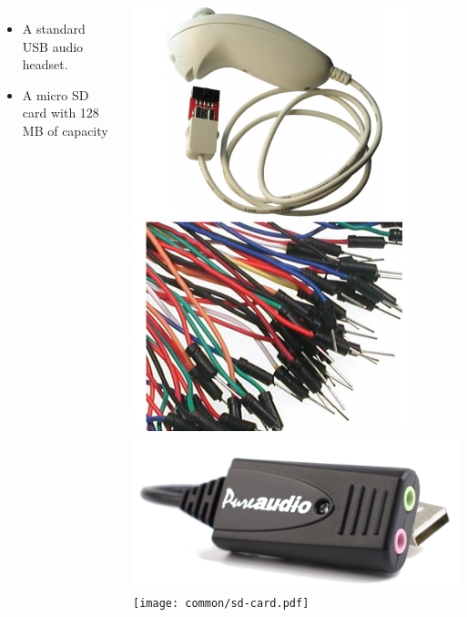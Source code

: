 \begin{frame}
\begin{columns}
\begin{itemize}
      \item A standard USB audio headset.
      \item A micro SD card with 128 MB of capacity
    \end{itemize}
    \includegraphics[height=0.25\textheight]{common/nunchuk.jpg} \\
    \includegraphics[height=0.15\textheight]{common/jumper-wires.jpg} \\
    \includegraphics[height=0.15\textheight]{common/usb-audio.png} \\
    \texttt{[image: common/sd-card.pdf]}
  \end{columns}
\end{frame}
